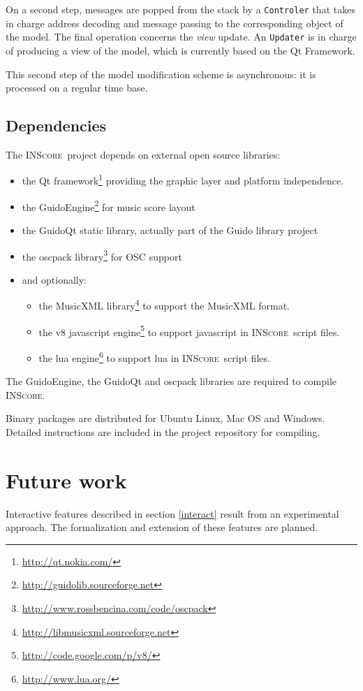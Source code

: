 \documentclass[11pt,letterpaper]{article}
\newcommand{\inscore}		{\textsc{\small INScore}}
\begin{document}
On a second step, messages are popped from the stack by a \texttt{Controler} that takes in charge address decoding and message passing to the corresponding object of the model. 
The final operation concerns the \emph{view} update. An \texttt{Updater} is in charge of producing a view of the model, which is currently based on the Qt Framework.

This second step of the model modification scheme is asynchronous: it is processed on a regular time base.

\subsection{Dependencies}

The \inscore\ project depends on external open source libraries:
\begin{itemize}
\item the Qt framework\footnote{\url{http://qt.nokia.com/}} providing the graphic layer and platform independence.
\item the GuidoEngine\footnote{\url{http://guidolib.sourceforge.net}} for music score layout
\item the GuidoQt static library, actually part of the Guido library project
\item the oscpack library\footnote{\url{http://www.rossbencina.com/code/oscpack}} for OSC support
\item and optionally: 
\begin{itemize}
     \item the MusicXML library\footnote{\url{http://libmusicxml.sourceforge.net}}
       to support the MusicXML format.
     \item the v8 javascript engine\footnote{\url{http://code.google.com/p/v8/}} to support javascript in \inscore\ script files.
     \item the lua engine\footnote{\url{http://www.lua.org/}} to support lua in \inscore\ script files.
\end{itemize}
\end{itemize}
The GuidoEngine, the GuidoQt and oscpack libraries are required to compile \inscore.

Binary packages are distributed for Ubuntu Linux, Mac OS and Windows. Detailed instructions are included in the project repository for compiling.


\section{Future work}
Interactive features described in section \ref{interact} result from an experimental approach. The formalization and extension of these features are planned.
\end{document}
